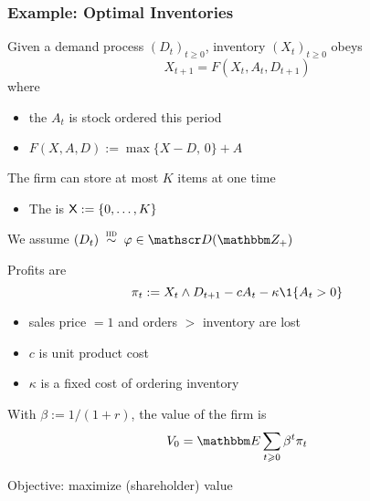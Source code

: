 \begin{frame}
    \frametitle{Example: Optimal Inventories}

    Given a demand process $(D_t)_{t \geq 0}$, inventory $(X_t)_{t \geq 0}$
    obeys
    \begin{equation*}
        X_{t+1} = F(X_t, A_t, D_{t+1}) 
    \end{equation*}
    where

    \begin{itemize}
        \item the  $A_t$ is stock ordered this period 
        \vspace{0.5em}
        \item $F(X, A, D) := \max\{X - D, \, 0\} + A$
    \end{itemize}

    \vspace{0.5em}
    The firm can store at most $K$ items at one time

    \vspace{0.5em}
    \begin{itemize}
        \item The  is $\mathsf X := \{0, \ldots, K\}$
    \end{itemize}

    \vspace{0.5em}
    We assume $(D_t) \iidsim \phi \in \dD(\ZZ_+)$  

\end{frame}

\begin{frame}
    
    Profits are 
    \begin{equation*}
        \pi_t := X_t \wedge D_{t+1} - c A_t - \kappa \1\{A_t > 0\}
    \end{equation*}

    \begin{itemize}
        \item sales price $=1$ and orders $>$ inventory are lost 
    \vspace{0.5em}
        \item $c$ is unit product cost 
    \vspace{0.5em}
        \item $\kappa$ is a fixed cost of ordering inventory
    \end{itemize}

    \vspace{0.5em}
    \vspace{0.5em}

    With $\beta := 1/(1+r)$, the value of the firm is 
    \begin{equation*}
        V_0 = \EE \sum_{t \geq 0} \beta^t \pi_t
    \end{equation*}

    \vspace{0.5em}
    \vspace{0.5em}
    Objective: maximize (shareholder) value

\end{frame}


